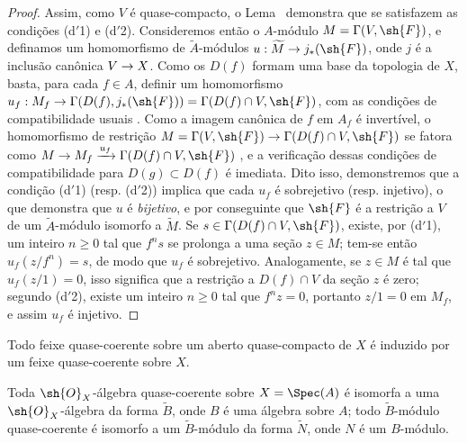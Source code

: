 \documentclass[oneside]{amsart}
\makeatletter
\renewcommand{\geq}{\geqslant}
\newcommand{\ega@arrow}[2]{\mathchoice{#1}{#2}{#2}{#2}}
\renewcommand{\to}{\ega@arrow{\longrightarrow}{\rightarrow}}
\let\EGAOriginalLabel\label
\renewcommand{\label}[1]{\phantomsection\EGAOriginalLabel{#1}}
\makeatother
\begin{document}
\begin{proof}
Assim, como $V$ é quase-compacto, o Lema~ demonstra que se satisfazem as condições (d$'$1) e (d$'$2).
Consideremos então o $A$-módulo $M=\Gamma(V,\sh{F})$, e definamos um homomorfismo de $\widetilde{A}$-módulos $u:\widetilde{M}\to j_*(\sh{F})$, onde $j$ é a inclusão canônica $V\to X$.
Como os $D(f)$ formam uma base da topologia de $X$, basta, para cada $f\in A$, definir um homomorfismo $u_f:M_f\to\Gamma(D(f),j_*(\sh{F}))=\Gamma(D(f)\cap V,\sh{F})$, com as condições de compatibilidade usuais .
Como a imagem canônica de $f$ em $A_f$ é invertível, o homomorfismo de restrição $M=\Gamma(V,\sh{F})\to\Gamma(D(f)\cap V,\sh{F})$ se fatora como $M\to M_f\xrightarrow{u_f}\Gamma(D(f)\cap V,\sh{F})$ , e a verificação dessas condições de compatibilidade para $D(g)\subset D(f)$ é imediata.
Dito isso, demonstremos que a condição (d$'$1) (resp. (d$'$2)) implica que cada $u_f$ é sobrejetivo (resp. injetivo), o que demonstra que $u$ é \emph{bijetivo}, e por conseguinte que $\sh{F}$ é a restrição a $V$ de um $\widetilde{A}$-módulo isomorfo a $\widetilde{M}$.
Se $s\in\Gamma(D(f)\cap V,\sh{F})$, existe, por (d$'$1), um inteiro $n\geq 0$ tal que $f^n s$ se prolonga a uma seção $z\in M$;
tem-se então $u_f(z/f^n)=s$, de modo que $u_f$ é sobrejetivo.
Analogamente, se $z\in M$ é tal que $u_f(z/1)=0$, isso significa que a restrição a $D(f)\cap V$ da seção $z$ é zero;
segundo (d$'$2), existe um inteiro $n\geq 0$ tal que $f^n z=0$, portanto $z/1=0$ em $M_f$, e assim $u_f$ é injetivo.
\end{proof}

\begin{corollary}[1.4.2]
\label{I.1.4.2}
Todo feixe quase-coerente sobre um aberto quase-compacto de $X$ é induzido por um feixe quase-coerente sobre $X$.
\end{corollary}

\begin{corollary}[1.4.3]
\label{I.1.4.3}
Toda $\sh{O}_X$-álgebra quase-coerente sobre $X=\Spec(A)$ é isomorfa a uma $\sh{O}_X$-álgebra da forma $\widetilde{B}$, onde $B$ é uma álgebra sobre $A$;
todo $\widetilde{B}$-módulo quase-coerente é isomorfo a um $\widetilde{B}$-módulo da forma $\widetilde{N}$, onde $N$ é um $B$-módulo.
\end{corollary}
\end{document}
